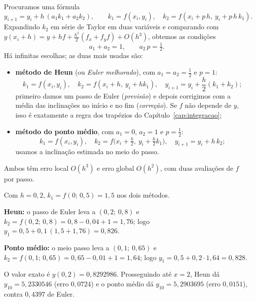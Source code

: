Procuramos uma fórmula
\[
y_{i+1}=y_i+h\,(a_1k_1+a_2k_2),\qquad k_1=f(x_i,y_i),\quad k_2=f(x_i+p\,h,\ y_i+p\,h\,k_1).
\]
Expandindo $k_2$ em série de Taylor em duas variáveis e comparando com
$y(x_i+h)=y+hf+\frac{h^2}{2}(f_x+f_yf)+O(h^3)$, obtemos as condições
\[
a_1+a_2=1,\qquad a_2\,p=\tfrac12.
\]
Há infinitas escolhas; as duas mais usadas são:
\begin{itemize}[nosep]
  \item \textbf{método de Heun} (ou \emph{Euler melhorado}), com $a_1=a_2=\frac12$ e $p=1$:
        \[
        k_1=f(x_i,y_i),\quad k_2=f(x_i+h,\ y_i+hk_1),\quad y_{i+1}=y_i+\frac h2(k_1+k_2);
        \]
        primeiro damos um passo de Euler (\emph{previsão}) e depois corrigimos com a média das
        inclinações no início e no fim (\emph{correção}). Se $f$ não depende de $y$, isso é
        exatamente a regra dos trapézios do Capítulo~\ref{cap:integracao};
  \item \textbf{método do ponto médio}, com $a_1=0$, $a_2=1$ e $p=\frac12$:
        \[
        k_1=f(x_i,y_i),\quad k_2=f\bigl(x_i+\tfrac h2,\ y_i+\tfrac h2k_1\bigr),\quad y_{i+1}=y_i+h\,k_2;
        \]
        usamos a inclinação estimada no meio do passo.
\end{itemize}
Ambos têm erro local $O(h^3)$ e erro global $O(h^2)$, com duas avaliações de $f$ por passo.

\begin{exemplo}
Com $h=0{,}2$, $k_1=f(0;\,0{,}5)=1{,}5$ nos dois métodos.

\textbf{Heun:} o passo de Euler leva a $(0{,}2;\ 0{,}8)$ e
$k_2=f(0{,}2;\,0{,}8)=0{,}8-0{,}04+1=1{,}76$; logo
$y_1=0{,}5+0{,}1\,(1{,}5+1{,}76)=0{,}826$.

\textbf{Ponto médio:} o meio passo leva a $(0{,}1;\ 0{,}65)$ e
$k_2=f(0{,}1;\,0{,}65)=0{,}65-0{,}01+1=1{,}64$; logo $y_1=0{,}5+0{,}2\cdot1{,}64=0{,}828$.

O valor exato é $y(0{,}2)=0{,}8292986$. Prosseguindo até $x=2$, Heun dá
$y_{10}=5{,}2330546$ (erro $0{,}0724$) e o ponto médio dá $y_{10}=5{,}2903695$ (erro
$0{,}0151$), contra $0{,}4397$ de Euler.
\end{exemplo}

